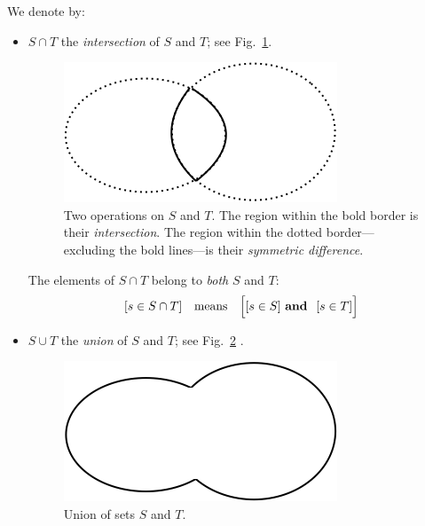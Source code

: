 \bigskip

\noindent
We denote by:
\begin{itemize}
\item
$S \cap T$ the {\it intersection} of $S$ and $T$; see Fig.~\ref{fig:setIntersection}.
\begin{figure}[htb]
\begin{center}
        \includegraphics[scale=0.4]{FiguresMaths/setIntersection}
        \caption{Two operations on $S$ and $T$. The region within the bold border is their {\em intersection}. The region within the dotted border---excluding the bold lines---is their {\em symmetric difference}.}
        \label{fig:setIntersection}
\end{center}
\end{figure}

\smallskip

The elements of $S \cap T$ belong to {\em both} $S$ and $T$:
\[ [s \in S \cap T] \ \ \mbox{ means } \ \ 
\Big[ [s \in S] \ \mbox{\bf and } \ [s \in T] \Big]
\]

\medskip\item
$S \cup T$ the {\it union} of $S$ and $T$; see Fig.~\ref{fig:setUnion} .
\begin{figure}[htb]
\begin{center}
        \includegraphics[scale=0.4]{FiguresMaths/setUnion}
        \caption{Union of sets $S$ and $T$.}
        \label{fig:setUnion}
\end{center}
\end{figure}

\smallskip


\end{itemize}
